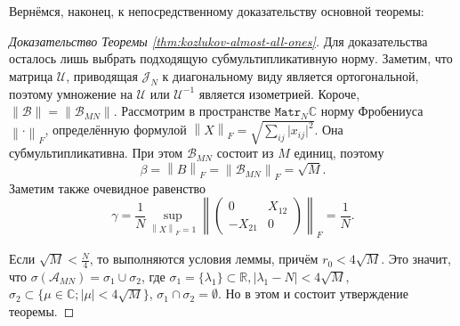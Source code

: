Верн\"емся, наконец, к непосредственному доказательству основной теоремы:
\begin{proof}[Доказательство Теоремы \ref{thm:kozlukov-almost-all-ones}]
    Для доказательства осталось лишь выбрать подходящую субмультипликативную норму.
    Заметим, что матрица \( \mathcal{U} \),
    приводящая \( \mathcal{J}_N \) к диагональному виду
    является ортогональной,
    поэтому умножение на \( \mathcal{U} \) или \(\mathcal{U}^{-1}\)
    является изометрией.
    Короче, \( \|\mathcal{B}\|=\|\mathscr{B}_{MN}\| \).
    Рассмотрим в пространстве \( \mathtt{Matr}_{N}\mathbb{C} \)
    норму Фробениуса \( {\left\|\cdot\right\|}_{F} \),
    определ\"енную формулой
    \( {\left\|X\right\|}_{F} = \sqrt{\sum_{ij} \lvert x_{ij}\rvert^2}. \)
    Она субмультипликативна.
    При этом
    \( \mathscr{B}_{MN} \) состоит из \( M \) единиц, поэтому
    \[
        \beta = {\left\|B\right\|}_{F} =
        {\left\|\mathscr{B}_{MN}\right\|}_{F} = \sqrt{M}.
        \]
    Заметим также очевидное равенство
    \[
        \gamma = \frac1N
                \sup_{{\left\|X\right\|}_{F}=1}{\left\|\begin{pmatrix}0 & X_{12} \\ -X_{21} & 0\end{pmatrix}\right\|}_{F}
                = \frac1N. \]
    
    Если
     \( \sqrt{M} < \frac{N}{4} \),
     то выполняются условия леммы,
     прич\"ем \( r_0 < 4\sqrt{M} \).
    Это значит, что
     \( \sigma(\mathscr{A}_{MN}) = \sigma_1 \cup \sigma_2 \),
     где \( \sigma_1 = \{ \lambda_1 \}\subset\mathbb{R}, \lvert \lambda_1 - N \rvert < 4\sqrt{M} \),
     \( \sigma_2 \subset \{ \mu\in\mathbb{C}; \lvert\mu\rvert < 4\sqrt{M} \} \),
     \( \sigma_1 \cap \sigma_2 = \emptyset \).
    Но в этом и состоит утверждение теоремы.
    \end{proof}

